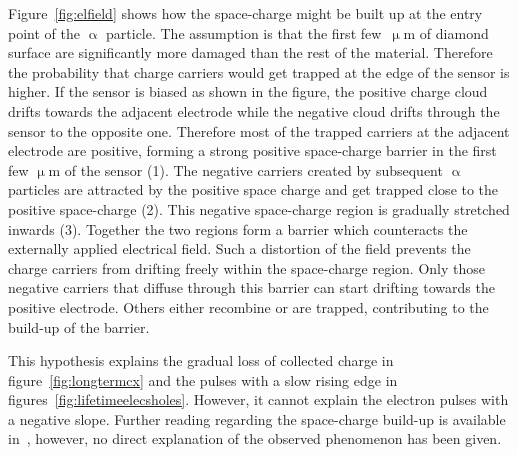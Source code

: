 \begin{description}
Figure~\ref{fig:elfield} shows how the space-charge might be built up at the entry point of the $\upalpha$ particle. The assumption is that the first few~$\upmu$m of diamond surface are significantly more damaged than the rest of the material. Therefore the probability that charge carriers would get trapped at the edge of the sensor is higher. If the sensor is biased as shown in the figure, the positive charge cloud drifts towards the adjacent electrode while the negative cloud drifts through the sensor to the opposite one. Therefore most of the trapped carriers at the adjacent electrode are positive, forming a strong positive space-charge barrier in the first few $\upmu$m of the sensor (1). The negative carriers created by subsequent $\upalpha$ particles are attracted by the positive space charge and get trapped close to the positive space-charge (2). This negative space-charge region is gradually stretched inwards (3). Together the two regions form a barrier which counteracts the externally applied electrical field. Such a distortion of the field prevents the charge carriers from drifting freely within the space-charge region. Only those negative carriers that diffuse through this barrier can start drifting towards the positive electrode. Others either recombine or are trapped, contributing to the build-up of the barrier. 

This hypothesis explains the gradual loss of collected charge in figure~\ref{fig:longtermcx} and the pulses with a slow rising edge in figures~\ref{fig:lifetimeelecsholes}. However, it cannot explain the electron pulses with a negative slope. Further reading regarding the space-charge build-up is available in~\cite{Eremin2002537,	4327634, s150613424}, however, no direct explanation of the observed phenomenon has been given.

\end{description}








